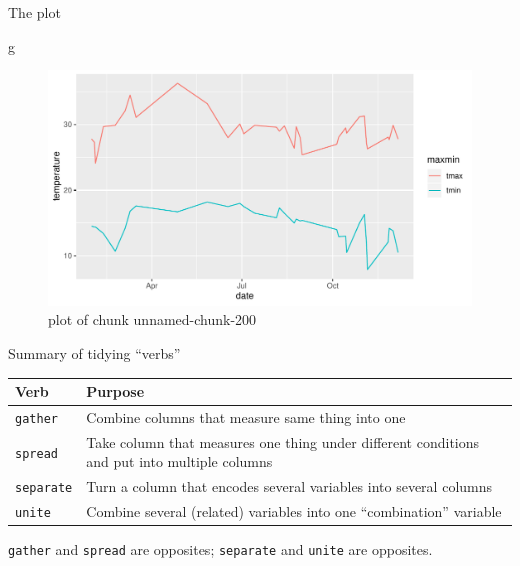 \documentclass[ignorenonframetext,]{beamer}
\newenvironment{Shaded}{\begin{snugshade}}{\end{snugshade}}
\newcommand{\NormalTok}[1]{#1}
\begin{document}
\begin{frame}[fragile]{The plot}
\protect\hypertarget{the-plot}{}

\begin{Shaded}
\begin{Highlighting}[]
\NormalTok{g}
\end{Highlighting}
\end{Shaded}

\begin{figure}
\centering
\includegraphics{figure/unnamed-chunk-200-1.pdf}
\caption{plot of chunk unnamed-chunk-200}
\end{figure}

\end{frame}

\begin{frame}{Summary of tidying ``verbs''}
\protect\hypertarget{summary-of-tidying-verbs}{}

\begin{tabular}{lp{}}
    Verb & Purpose\\
    \hline
    \texttt{gather}& Combine columns that measure same thing into one\\
    \texttt{spread}& Take column that measures one thing under
                     different conditions and put into multiple columns\\
    \texttt{separate} & Turn a column that encodes
                        several variables into
                        several columns\\
    \texttt{unite} & Combine several (related) variables into one
                     ``combination'' variable\\
    \hline
  \end{tabular}

\texttt{gather} and \texttt{spread} are opposites; \texttt{separate} and
\texttt{unite} are opposites.

\end{frame}
\end{document}
